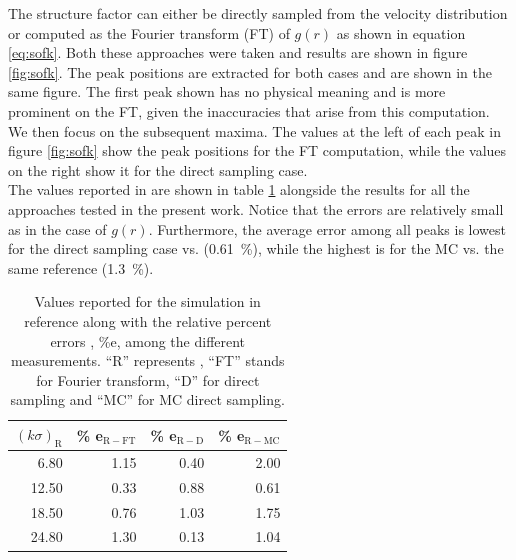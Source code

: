 \documentclass[%
aps,
pra,%
amsmath,amssymb,
preprint,%
reprint,%
notitlepage,
a4paper]{revtex4-1}
\begin{document}
The structure factor can either be directly sampled from the velocity distribution or computed as the Fourier transform (FT) of $g(r)$ as shown in equation \ref{eq:sofk}. Both these approaches were taken and results are shown in figure \ref{fig:sofk}. The peak positions are extracted for both cases and are shown in the same figure. The first peak shown has no physical meaning and is more prominent on the FT, given the inaccuracies that arise from this computation. We then focus on the subsequent maxima. The values at the left of each peak in figure \ref{fig:sofk} show the peak positions for the FT computation, while the values on the right show it for the direct sampling case.\\
The values reported in \citet{Rahman1964} are shown in table \ref{tab:sofk} alongside the results for all the approaches tested in the present work. Notice that the errors are relatively small as in the case of $g(r)$. Furthermore, the average error among all peaks is lowest for the direct sampling case vs. \citet{Rahman1964} (0.61~\%), while the highest is for the MC vs. the same reference (1.3~\%).
\begin{table}
\begin{tabular}{rrrr}
	\hline
	$(k\sigma)_\mathrm{R}$ &   \% e$_\mathrm{R-FT}$ &   \% e$_\mathrm{R-D}$ &   \% e$_\mathrm{R-MC}$ \\
	\hline
	6.80 &                    1.15 &                   0.40 &                    2.00 \\
	12.50 &                    0.33 &                   0.88 &                    0.61 \\
	18.50 &                    0.76 &                   1.03 &                    1.75 \\
	24.80 &                    1.30 &                   0.13 &                    1.04 \\
	\hline
\end{tabular}

\caption{\label{tab:sofk}Values reported for the simulation in reference \cite{Rahman1964} along with the relative percent errors , \%e, among the different measurements. ``R'' represents \citet{Rahman1964}, ``FT'' stands for Fourier transform, ``D'' for direct sampling and ``MC'' for MC direct sampling.}
\end{table}
\end{document}
